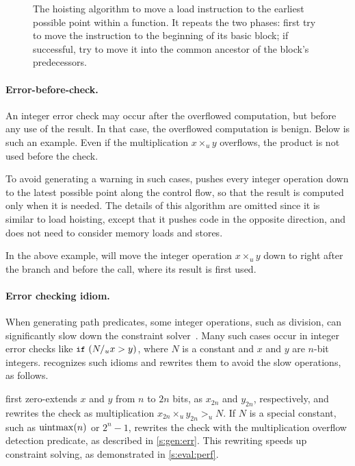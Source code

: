 \begin{figure}

\caption{The hoisting algorithm to move a load instruction to the
earliest possible point within a function.  It repeats the two
phases: first try to move the instruction to the beginning of its
basic block; if successful, try to move it into the common ancestor
of the block's predecessors.}
\label{f:hoist}
\end{figure}
\fi

\paragraph{Error-before-check.}
An integer error check may occur after the overflowed computation,
but before any use of the result.  In that case, the overflowed
computation is benign.  Below is such an example.  Even if the
multiplication $x \times_u y$ overflows, the product  is
not used before the check.


To avoid generating a warning in such cases, \sys pushes every
integer operation down to the latest possible point along the control
flow, so that the result is computed only when it is needed.  The
details of this algorithm are omitted since it is similar to load
hoisting, except that it pushes code in the opposite direction, and
does not need to consider memory loads and stores.

In the above example, \sys will move the integer operation $x
\times_u y$ down to right after the  branch and before the
 call, where its result  is first used.

\paragraph{Error checking idiom.}

When generating path predicates, some integer
operations, such as division, can significantly slow down the constraint
solver~\cite{brummayer:perf}.  Many such cases occur in integer
error checks like $\cc{if}\ (N /_u x > y)$, where $N$ is a constant
and $x$ and $y$ are $n$-bit integers.  \sys recognizes such idioms and
rewrites them to avoid the slow operations, as follows.

\sys first zero-extends $x$ and $y$ from $n$ to $2n$ bits, as
$x_{2n}$ and $y_{2n}$, respectively, and rewrites the check as
multiplication $x_{2n} \times_u y_{2n} >_u N$.  If $N$ is a special
constant, such as $\operatorname{uintmax}(n)$ or $2^n-1$, \sys rewrites the check
with the multiplication overflow detection predicate, as described
in \autoref{s:gen:err}.
%
This rewriting speeds up constraint solving, as demonstrated in
\autoref{s:eval:perf}.

